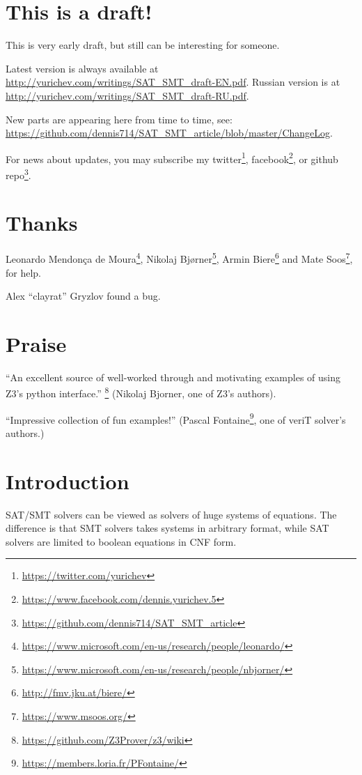 \section{This is a draft!}

This is very early draft, but still can be interesting for someone.

Latest version is always available at \url{http://yurichev.com/writings/SAT_SMT_draft-EN.pdf}.
Russian version is at \url{http://yurichev.com/writings/SAT_SMT_draft-RU.pdf}.

New parts are appearing here from time to time, see: \url{https://github.com/dennis714/SAT_SMT_article/blob/master/ChangeLog}.

For news about updates, you may subscribe my 
twitter\footnote{\url{https://twitter.com/yurichev}}, 
facebook\footnote{\url{https://www.facebook.com/dennis.yurichev.5}}, 
or github repo\footnote{\url{https://github.com/dennis714/SAT_SMT_article}}.

\section{Thanks}

Leonardo Mendonça de Moura\footnote{\url{https://www.microsoft.com/en-us/research/people/leonardo/}},
Nikolaj Bjørner\footnote{\url{https://www.microsoft.com/en-us/research/people/nbjorner/}},
Armin Biere\footnote{\url{http://fmv.jku.at/biere/}} and
Mate Soos\footnote{\url{https://www.msoos.org/}},
for help.

Alex ``clayrat'' Gryzlov found a bug.

\section{Praise}

``An excellent source of well-worked through and motivating examples of using Z3's python interface.''
\footnote{\url{https://github.com/Z3Prover/z3/wiki}}
(Nikolaj Bjorner, one of Z3's authors).

``Impressive collection of fun examples!''
(Pascal Fontaine\footnote{\url{https://members.loria.fr/PFontaine/}}, one of veriT solver's authors.)

\section{Introduction}

\ac{SAT}/\ac{SMT} solvers can be viewed as solvers of huge systems of equations.
The difference is that \ac{SMT} solvers takes systems in arbitrary format,
while \ac{SAT} solvers are limited to boolean equations in \ac{CNF} form.

